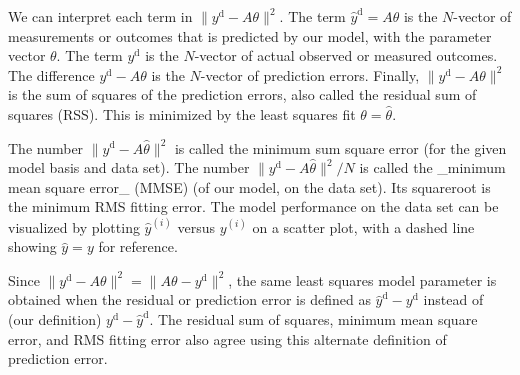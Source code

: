 We can interpret each term in \(\|y^{\mathrm{d}}-A\theta\|^{2}\). The term \(\hat{y}^{\mathrm{d}}=A\theta\) is the \(N\)-vector of measurements or outcomes that is predicted by our model, with the parameter vector \(\theta\). The term \(y^{\mathrm{d}}\) is the \(N\)-vector of actual observed or measured outcomes. The difference \(y^{\mathrm{d}}-A\theta\) is the \(N\)-vector of prediction errors. Finally, \(\|y^{\mathrm{d}}-A\theta\|^{2}\) is the sum of squares of the prediction errors, also called the residual sum of squares (RSS). This is minimized by the least squares fit \(\theta=\hat{\theta}\).

The number \(\|y^{\mathrm{d}}-A\hat{\theta}\|^{2}\) is called the minimum sum square error (for the given model basis and data set). The number \(\|y^{\mathrm{d}}-A\hat{\theta}\|^{2}/N\) is called the _minimum mean square error_ (MMSE) (of our model, on the data set). Its squareroot is the minimum RMS fitting error. The model performance on the data set can be visualized by plotting \(\hat{y}^{(i)}\) versus \(y^{(i)}\) on a scatter plot, with a dashed line showing \(\hat{y}=y\) for reference.

Since \(\|y^{\mathrm{d}}-A\theta\|^{2}=\|A\theta-y^{\mathrm{d}}\|^{2}\), the same least squares model parameter is obtained when the residual or prediction error is defined as \(\hat{y}^{\mathrm{d}}-y^{\mathrm{d}}\) instead of (our definition) \(y^{\mathrm{d}}-\hat{y}^{\mathrm{d}}\). The residual sum of squares, minimum mean square error, and RMS fitting error also agree using this alternate definition of prediction error.

 